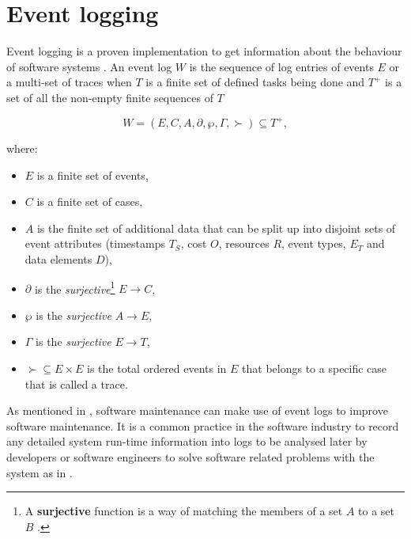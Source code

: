 \section{Event logging}\label{sec:ch1_eventLogging}
Event logging is a proven implementation to get information about the behaviour of software systems \cite{Baccanico2014}.
An event log $W$ is the sequence of log entries of events $E$ or a multi-set of traces when $T$ is a finite set of defined tasks being done and $T^+$ is a set of all the non-empty finite sequences of $T$ \cite{Kherbouche2017}

\begin{equation}
	\label{eq:LogEvent}
	W = (E, C, A, \partial, \wp, \Gamma, \succ) \subseteq T^+,
\end{equation}

where:

\begin{itemize}
	\item $E$ is a finite set of events,
	\item $C$ is a finite set of cases,
	\item $A$ is the finite set of additional data that can be split up into disjoint sets of event attributes (timestamps $T_S$, cost $O$, resources $R$, event types, $E_T$ and data elements $D$),
	\item $\partial$ is the \textit{surjective}\footnote{\label{ftn:Surjective}A \textbf{surjective} function is a way of matching the members of a set $A$ to a set $B$ \cite{Szendrei1990}.} $E\rightarrow C$,
	\item $\wp$ is the \textit{surjective} $A\rightarrow E$,
	\item $\Gamma$ is the \textit{surjective} $E\rightarrow T$,
	\item $\succ \subseteq E\times E$ is the total ordered events in $E$ that belongs to a specific case that is called a trace.
\end{itemize}

As mentioned in , software maintenance can make use of event logs to improve software maintenance. It is a common practice in the software industry to record any detailed system run-time information into logs to be analysed later by developers or software engineers to solve software related problems with the system as in  \cite{Zhu2019}.

